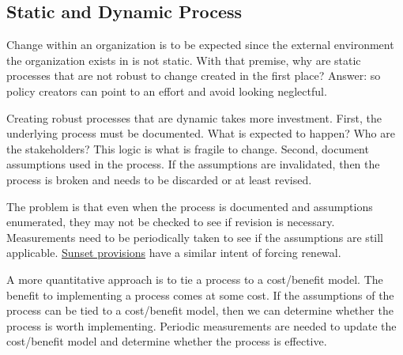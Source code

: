 \subsection{Static and Dynamic Process}


Change within an organization is to be expected since the external environment the organization exists in is not static. With that premise, why are static processes that are not robust to change created in the first place? Answer: so policy creators can point to an effort and avoid looking neglectful.

Creating robust processes that are dynamic takes more investment. First, the underlying process must be documented. What is expected to happen? Who are the stakeholders? This logic is what is fragile to change. Second, document assumptions used in the process. If the assumptions are invalidated, then the process is broken and needs to be discarded or at least revised. 

The problem is that even when the process is documented and assumptions enumerated, they may not be checked to see if revision is necessary. Measurements need to be periodically taken to see if the assumptions are still applicable. \href{https://en.wikipedia.org/wiki/Sunset_provision}{Sunset provisions} have a similar intent of forcing renewal. 

A more quantitative approach is to tie a process to a cost/benefit model. The benefit to implementing a process comes at some cost. If the assumptions of the process can be tied to a cost/benefit model, then we can determine whether the process is worth implementing. Periodic measurements are needed to update the cost/benefit model and determine whether the process is effective.
